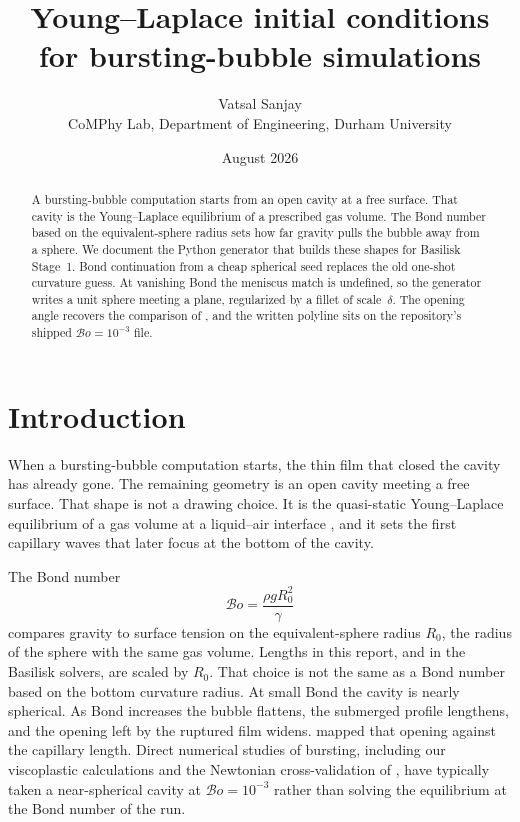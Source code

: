 \documentclass[11pt,a4paper]{article}
\title{Young--Laplace initial conditions for bursting-bubble simulations}
\author{Vatsal Sanjay\\[0.4em]
\small CoMPhy Lab, Department of Engineering, Durham University}
\date{August 2026}
\newcommand{\Bo}{\mathcal{B}o}
\newcommand{\Rzero}{R_0}
\begin{document}
\maketitle

\begin{abstract}
A bursting-bubble computation starts from an open cavity at a free surface.
That cavity is the Young--Laplace equilibrium of a prescribed gas volume.
The Bond number based on the equivalent-sphere radius sets how far gravity
pulls the bubble away from a sphere. We document the Python generator that
builds these shapes for Basilisk Stage~1. Bond continuation from a cheap
spherical seed replaces the old one-shot curvature guess. At vanishing Bond
the meniscus match is undefined, so the generator writes a unit sphere
meeting a plane, regularized by a fillet of scale~$\delta$. The opening
angle recovers the comparison of \citet{Lhuissier2012}, and the written
polyline sits on the repository's shipped $\Bo=10^{-3}$ file.
\end{abstract}

\section{Introduction}
\label{sec:intro}

When a bursting-bubble computation starts, the thin film that closed the
cavity has already gone. The remaining geometry is an open cavity meeting a
free surface. That shape is not a drawing choice. It is the quasi-static
Young--Laplace equilibrium of a gas volume at a liquid--air interface
\citep{Princen1963}, and it sets the first capillary waves that later focus
at the bottom of the cavity.

The Bond number
\begin{equation}
  \Bo = \frac{\rho g \Rzero^2}{\gamma}
\end{equation}
compares gravity to surface tension on the equivalent-sphere radius
$\Rzero$, the radius of the sphere with the same gas volume. Lengths in
this report, and in the Basilisk solvers, are scaled by $\Rzero$. That
choice is not the same as a Bond number based on the bottom curvature
radius. At small Bond the cavity is nearly spherical. As Bond increases the
bubble flattens, the submerged profile lengthens, and the opening left by
the ruptured film widens. \citet{Lhuissier2012} mapped that opening against
the capillary length. Direct numerical studies of bursting, including our
viscoplastic calculations \citep{Sanjay2021} and the Newtonian
cross-validation of \citet{Deike2018}, have typically taken a
near-spherical cavity at $\Bo=10^{-3}$ rather than solving the equilibrium
at the Bond number of the run.
\end{document}
